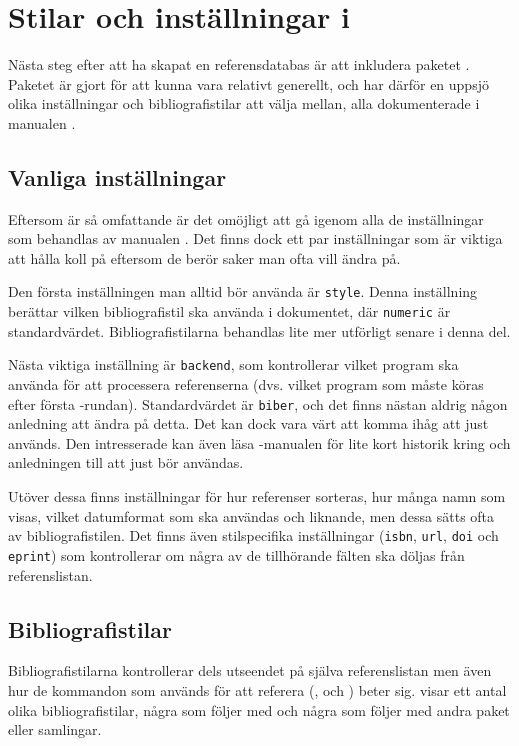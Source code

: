 \documentclass[10pt,../../a4.tex]{subfiles}
\begin{document}
\section{Stilar och inställningar i \texorpdfstring{}{biblatex}}
Nästa steg efter att ha skapat en referensdatabas är att inkludera
paketet . Paketet är gjort för att kunna vara relativt
generellt, och har därför en uppsjö olika inställningar och
bibliografistilar att välja mellan, alla dokumenterade i manualen
\parencite{Lehman13}.

\subsection{Vanliga inställningar}
Eftersom  är så omfattande är det omöjligt att gå igenom
alla de inställningar som behandlas av manualen \parencite{Lehman13}. Det
finns dock ett par inställningar som är viktiga att hålla koll på eftersom
de berör saker man ofta vill ändra på.

Den första inställningen man alltid bör använda är \texttt{style}. Denna
inställning berättar vilken bibliografistil  ska använda
i dokumentet, där \texttt{numeric} är standardvärdet. Bibliografistilarna
behandlas lite mer utförligt senare i denna del.

Nästa viktiga inställning är \texttt{backend}, som kontrollerar vilket
program  ska använda för att processera referenserna
(dvs. vilket program som måste köras efter första \pdfLaTeX-rundan).
Standardvärdet är \texttt{biber}, och det finns nästan aldrig någon
anledning att ändra på detta. Det kan dock vara värt att komma ihåg
att just  används. Den intresserade kan även läsa
-manualen \parencite[\ppno~3\psqq]{Kime13} för lite kort
historik kring  och anledningen till att just 
bör användas.

Utöver dessa finns inställningar för hur referenser sorteras, hur många
namn som visas, vilket datumformat som ska användas och liknande, men
dessa sätts ofta av bibliografistilen.
Det finns även stilspecifika inställningar (\texttt{isbn}, \texttt{url},
\texttt{doi} och \texttt{eprint}) som kontrollerar om några av de
tillhörande fälten ska döljas från referenslistan.

\subsection{Bibliografistilar}
Bibliografistilarna kontrollerar dels utseendet på själva referenslistan
men även hur de kommandon som används för att referera (,
 och ) beter sig.
 visar ett antal olika
bibliografistilar, några som följer med  och några som
följer med andra paket eller samlingar.
\end{document}

